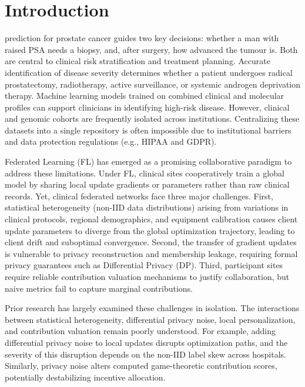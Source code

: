 \documentclass[journal]{IEEEtran}
\begin{document}
\section{Introduction}
 prediction for prostate cancer guides two key decisions: whether a man with raised PSA needs a biopsy, and, after surgery, how advanced the tumour is. Both are central to clinical risk stratification and treatment planning. Accurate identification of disease severity determines whether a patient undergoes radical prostatectomy, radiotherapy, active surveillance, or systemic androgen deprivation therapy. Machine learning models trained on combined clinical and molecular profiles can support clinicians in identifying high-risk disease. However, clinical and genomic cohorts are frequently isolated across institutions. Centralizing these datasets into a single repository is often impossible due to institutional barriers and data protection regulations (e.g., HIPAA and GDPR).

Federated Learning (FL) has emerged as a promising collaborative paradigm to address these limitations. Under FL, clinical sites cooperatively train a global model by sharing local update gradients or parameters rather than raw clinical records. Yet, clinical federated networks face three major challenges. First, statistical heterogeneity (non-IID data distributions) arising from variations in clinical protocols, regional demographics, and equipment calibration causes client update parameters to diverge from the global optimization trajectory, leading to client drift and suboptimal convergence. Second, the transfer of gradient updates is vulnerable to privacy reconstruction and membership leakage, requiring formal privacy guarantees such as Differential Privacy (DP). Third, participant sites require reliable contribution valuation mechanisms to justify collaboration, but naive metrics fail to capture marginal contributions.

Prior research has largely examined these challenges in isolation. The interactions between statistical heterogeneity, differential privacy noise, local personalization, and contribution valuation remain poorly understood. For example, adding differential privacy noise to local updates disrupts optimization paths, and the severity of this disruption depends on the non-IID label skew across hospitals. Similarly, privacy noise alters computed game-theoretic contribution scores, potentially destabilizing incentive allocation.
\end{document}
